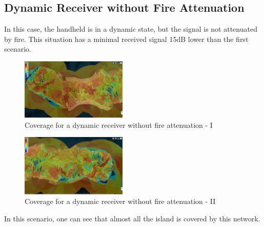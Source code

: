 \documentclass[letterpaper, 10 pt, conference]{ieeeconf}  %
\begin{document}
\subsection{Dynamic Receiver without Fire Attenuation}\noindent
In this case, the handheld is in a dynamic state, but the signal is not attenuated by fire. This situation has a minimal received signal 15dB lower than the first scenario. 
\begin{figure}[h!]
    \centering
    \includegraphics[width=0.45\textwidth]{RecetorDinamicoSemfogoI.JPG}
    \caption{Coverage for a dynamic receiver without fire attenuation - I}
    \label{fig:dinamicosemfogESTE}
\end{figure}
\begin{figure}[h!]
    \centering
    \includegraphics[width=0.45\textwidth]{RecetorDinamicoSemfogoII.JPG}
    \caption{Coverage for a dynamic receiver without fire attenuation - II}
    \label{fig:dinamicosemfogoOeste}
\end{figure} \FloatBarrier
\noindent
In this scenario, one can see that almost all the island is covered by this network.
\end{document}
